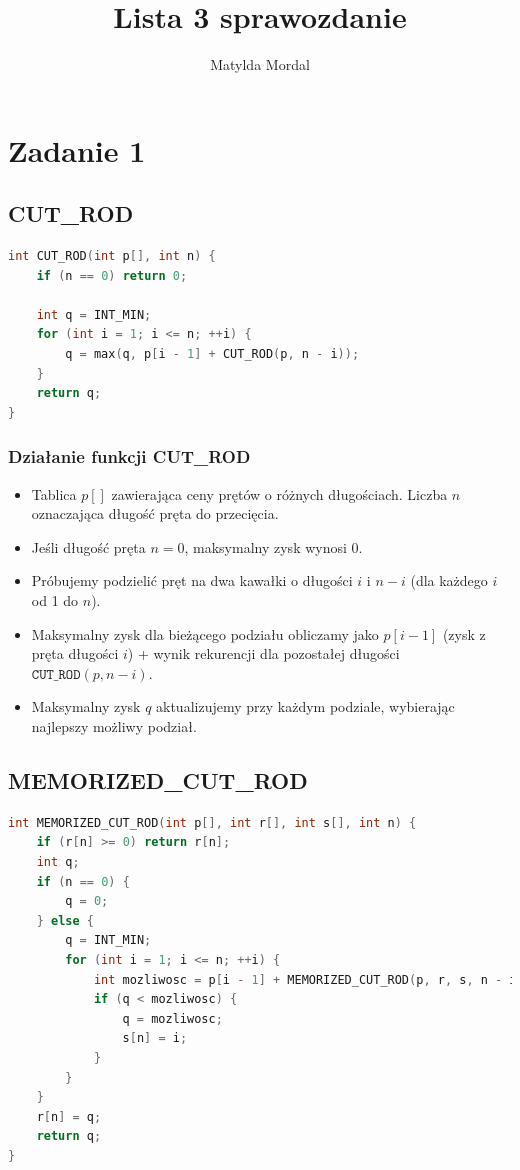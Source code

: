\documentclass{article}
\author{Matylda Mordal}
\title{\textbf{Lista 3 sprawozdanie}}
\date{}
\begin{document}
	\maketitle
	\section*{Zadanie 1}
		\subsection*{CUT\_ROD} 
		\begin{lstlisting}[language=C++, tabsize=3, basicstyle=\footnotesize]
int CUT_ROD(int p[], int n) {
	if (n == 0) return 0; 
	
	int q = INT_MIN;
	for (int i = 1; i <= n; ++i) { 
		q = max(q, p[i - 1] + CUT_ROD(p, n - i)); 
	}
	return q;
}
		\end{lstlisting}
	
			\subsubsection*{Działanie funkcji CUT\_ROD}
			\begin{itemize}
			\item Tablica $p[]$ zawierająca ceny prętów o różnych długościach. Liczba $n$ oznaczająca długość pręta do przecięcia.
			\item Jeśli długość pręta $n = 0$, maksymalny zysk wynosi $0$.
			\item Próbujemy podzielić pręt na dwa kawałki o długości $i$ i $n - i$ (dla każdego $i$ od 1 do $n$). \item Maksymalny zysk dla bieżącego podziału obliczamy jako $p[i - 1]$ (zysk z pręta długości $i$) + wynik rekurencji dla pozostałej długości $\texttt{CUT\_ROD}(p, n - i)$.
			\item Maksymalny zysk $q$ aktualizujemy przy każdym podziale, wybierając najlepszy możliwy podział.
			\end{itemize}
		
		\subsection*{MEMORIZED\_CUT\_ROD} 
		\begin{lstlisting}[language=C++, tabsize=3, basicstyle=\footnotesize]
int MEMORIZED_CUT_ROD(int p[], int r[], int s[], int n) {
	if (r[n] >= 0) return r[n];
	int q;
	if (n == 0) {
		q = 0; 
	} else {
		q = INT_MIN;
		for (int i = 1; i <= n; ++i) {
			int mozliwosc = p[i - 1] + MEMORIZED_CUT_ROD(p, r, s, n - i);
			if (q < mozliwosc) {
				q = mozliwosc;
				s[n] = i; 
			}
		}
	}
	r[n] = q; 
	return q;
}
	
		\end{lstlisting}
		
\end{document}
